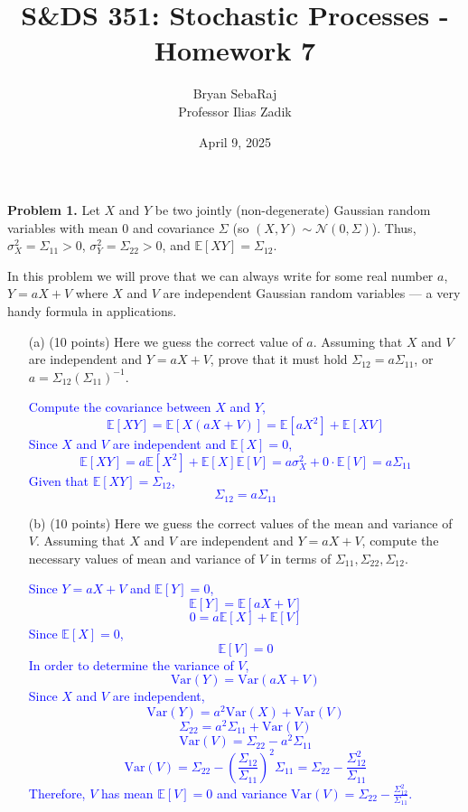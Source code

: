 \documentclass{article}
\title{S\&DS 351: Stochastic Processes - Homework 7}
\author{Bryan SebaRaj \\[0.8em] Professor Ilias Zadik}
\date{April 9, 2025}
\begin{document}
\maketitle


\textbf{Problem 1.} Let $X$ and $Y$ be two jointly (non-degenerate) Gaussian random variables with mean 0 and covariance $\Sigma$ (so $(X, Y) \sim \mathcal{N}(0, \Sigma)$). Thus, $\sigma_X^2 = \Sigma_{11} > 0$, $\sigma_Y^2 = \Sigma_{22} > 0$, and $\mathbb{E}[XY] = \Sigma_{12}$.

In this problem we will prove that we can always write for some real number $a$, $Y = aX + V$ where $X$ and $V$ are independent Gaussian random variables --- a very handy formula in applications.

\begin{enumerate}
    \item[(a)] (10 points) Here we guess the correct value of $a$. Assuming that $X$ and $V$ are independent and $Y = aX + V$, prove that it must hold $\Sigma_{12} = a\Sigma_{11}$, or $a = \Sigma_{12}(\Sigma_{11})^{-1}$.

        \textcolor{blue}{
Compute the covariance between $X$ and $Y$,
$$\mathbb{E}[XY] = \mathbb{E}[X(aX + V)] = \mathbb{E}[aX^2] + \mathbb{E}[XV]$$
Since $X$ and $V$ are independent and $\mathbb{E}[X] = 0$,
$$\mathbb{E}[XY]= a\mathbb{E}[X^2] + \mathbb{E}[X]\mathbb{E}[V] = a\sigma_X^2 + 0 \cdot \mathbb{E}[V] = a \Sigma_{11}$$
Given that $\mathbb{E}[XY] = \Sigma_{12}$,
$$\Sigma_{12} = a\Sigma_{11}$$
        }
    
    \item[(b)] (10 points) Here we guess the correct values of the mean and variance of $V$. Assuming that $X$ and $V$ are independent and $Y = aX + V$, compute the necessary values of mean and variance of $V$ in terms of $\Sigma_{11}, \Sigma_{22}, \Sigma_{12}$.

    \textcolor{blue}{
Since $Y = aX + V$ and $\mathbb{E}[Y] = 0$,
$$\mathbb{E}[Y] = \mathbb{E}[aX + V]$$
$$0 = a\mathbb{E}[X] + \mathbb{E}[V]$$
Since $\mathbb{E}[X] = 0$,
$$\mathbb{E}[V] = 0$$
In order to determine the variance of $V$,
$$\text{Var}(Y) = \text{Var}(aX + V)$$
Since $X$ and $V$ are independent,
$$\text{Var}(Y)= a^2\text{Var}(X) + \text{Var}(V)$$
$$\Sigma_{22} = a^2 \Sigma_{11} + \text{Var}(V)$$
$$\text{Var}(V) = \Sigma_{22} - a^2\Sigma_{11}$$
$$\text{Var}(V) = \Sigma_{22} - \left(\frac{\Sigma_{12}}{\Sigma_{11}}\right)^2 \Sigma_{11}= \Sigma_{22} - \frac{\Sigma_{12}^2}{\Sigma_{11}}$$
Therefore, $V$ has mean $\mathbb{E}[V] = 0$ and variance $\text{Var}(V) = \Sigma_{22} - \frac{\Sigma_{12}^2}{\Sigma_{11}}$.
    }


\end{enumerate}
\end{document}
